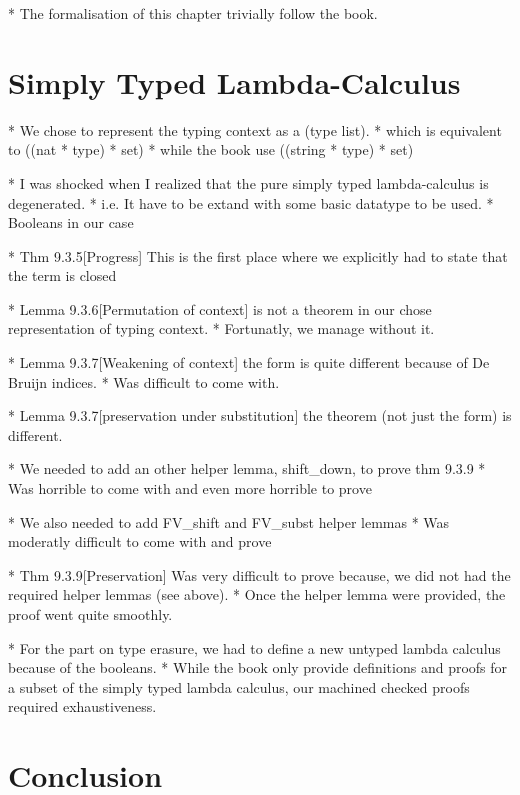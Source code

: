 \documentclass[a4paper, oneside, 12pt, titlepage]{article}
\begin{document}
  * The formalisation of this chapter trivially follow the book.

\section{Simply Typed Lambda-Calculus}

  * We chose to represent the typing context as a (type list).
    * which is equivalent to ((nat * type) * set)
    * while the book use ((string * type) * set)

  * I was shocked when I realized that the pure simply typed lambda-calculus is degenerated.
    * i.e. It have to be extand with some basic datatype to be used.
    * Booleans in our case

  * Thm 9.3.5[Progress] This is the first place where we explicitly had to state that the term is
    closed

  * Lemma 9.3.6[Permutation of context] is not a theorem in our chose representation of typing
    context.
    * Fortunatly, we manage without it.

  * Lemma 9.3.7[Weakening of context] the form is quite different because of De Bruijn indices.
    * Was difficult to come with.

  * Lemma 9.3.7[preservation under substitution] the theorem (not just the form) is different.

  * We needed to add an other helper lemma, shift\_down, to prove thm 9.3.9
    * Was horrible to come with and even more horrible to prove

  * We also needed to add FV\_shift and FV\_subst helper lemmas
    * Was moderatly difficult to come with and prove

  * Thm 9.3.9[Preservation] Was very difficult to prove because, we did not had the required helper
    lemmas (see above).
    * Once the helper lemma were provided, the proof went quite smoothly.

  * For the part on type erasure, we had to define a new untyped lambda calculus because of the
    booleans.
    * While the book only provide definitions and proofs for a subset of the simply typed lambda
      calculus, our machined checked proofs required exhaustiveness.

\section{Conclusion}
\end{document}
